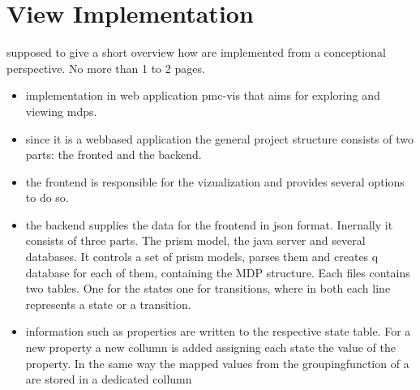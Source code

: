 \documentclass[preview]{standalone}
\begin{document}
\section{View Implementation} \label{ch:viewimpl}
supposed to give a short overview how \viewN are implemented from a conceptional perspective. No more than 1 to 2 pages.

\noindent
\begin{itemize}
	\item implementation in web application pmc-vis that aims for exploring and viewing mdps.
	\item since it is a webbased application the general project structure consists of two parts: the fronted and the backend. 
	\item the frontend is responsible for the vizualization and provides several options to do so.
	\item the backend supplies the data for the frontend in json format. Inernally it consists of three parts. The prism model, the java server and several databases. It controls a set of prism models, parses them and creates q database for each of them, containing the MDP structure. Each files contains two tables. One for the states one for transitions, where in both each line represents a state or a transition. 
	\item information such as properties are written to the respective state table. For a new property a new collumn is added assigning each state the value of the property. In the same way the mapped values from the groupingfunction of a \viewN are stored in a dedicated collumn 
	

\end{itemize}
\end{document}
